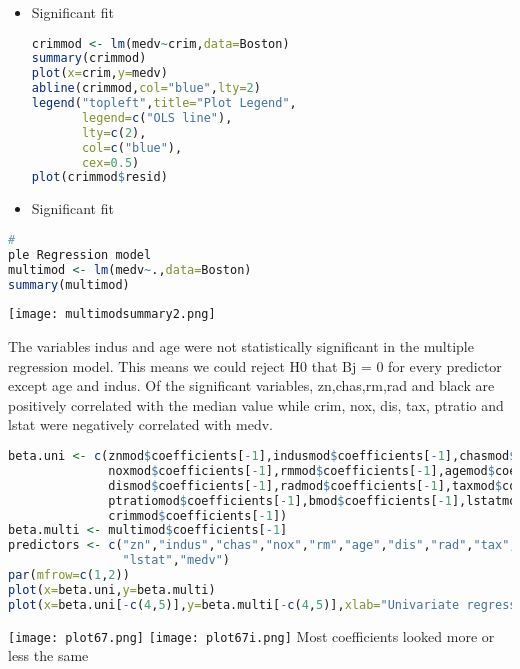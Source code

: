 \documentclass[11pt]{report}
\begin{document}
\begin{itemize}
\begin{lstlisting}[language=R]
lstatmod <- lm(medv~lstat,data=Boston)
summary(lstatmod) 
plot(y=medv,x=lstat) 
abline(lstatmod,col="blue",lty=2)
legend("topleft",title="Plot Legend",
       legend=c("OLS line"),
       lty=c(2),
       col=c("blue"),
       cex=0.5)
plot(lstatmod$resid)
\end{lstlisting}

\item[-] Significant fit

\begin{lstlisting}[language=R]
crimmod <- lm(medv~crim,data=Boston)
summary(crimmod) 
plot(x=crim,y=medv) 
abline(crimmod,col="blue",lty=2)
legend("topleft",title="Plot Legend",
       legend=c("OLS line"),
       lty=c(2),
       col=c("blue"),
       cex=0.5)
plot(crimmod$resid)
\end{lstlisting}

\item[-] Significant fit
\end{itemize}

\begin{lstlisting}[language=R]
# 
ple Regression model
multimod <- lm(medv~.,data=Boston)
summary(multimod)
\end{lstlisting}
\texttt{[image: multimodsummary2.png]}

The variables indus and age were not statistically significant in the multiple regression model. This means we could reject H0 that Bj = 0 for every predictor except age and indus. Of the significant variables, zn,chas,rm,rad and black are positively correlated with the median value while crim, nox, dis, tax, ptratio and lstat were negatively correlated with medv.

\begin{lstlisting}[language=R]
beta.uni <- c(znmod$coefficients[-1],indusmod$coefficients[-1],chasmod$coefficients[-1],
              noxmod$coefficients[-1],rmmod$coefficients[-1],agemod$coefficients[-1],
              dismod$coefficients[-1],radmod$coefficients[-1],taxmod$coefficients[-1],
              ptratiomod$coefficients[-1],bmod$coefficients[-1],lstatmod$coefficients[-1],
              crimmod$coefficients[-1])
beta.multi <- multimod$coefficients[-1] 
predictors <- c("zn","indus","chas","nox","rm","age","dis","rad","tax","ptratio","b",
                "lstat","medv")
par(mfrow=c(1,2))
plot(x=beta.uni,y=beta.multi)
plot(x=beta.uni[-c(4,5)],y=beta.multi[-c(4,5)],xlab="Univariate regression Betas without nox and rm",ylab="Multiple regresion Betas without nox and rm")
\end{lstlisting}
\texttt{[image: plot67.png]}
\texttt{[image: plot67i.png]}
Most coefficients looked more or less the same
\end{document}
